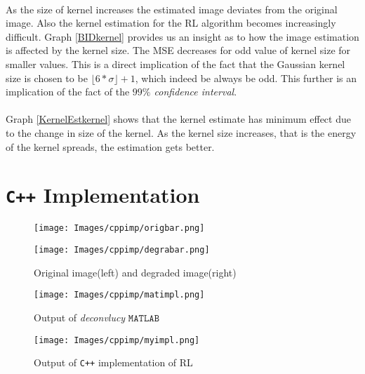 \documentclass[a4paper]{book}
\begin{document}
\paragraph*{} As the size of kernel increases the estimated image deviates from the original image. Also the kernel estimation for the RL algorithm becomes increasingly difficult. Graph \ref{BIDkernel} provides us an insight as to how the image estimation is affected by the kernel size. The MSE decreases for odd value of kernel size for smaller values. This is a direct implication of the fact that the Gaussian kernel size is chosen to be $\lfloor6*\sigma\rfloor + 1$, which indeed be always be odd. This further is an implication of the fact of the \textit{$ 99\% $ confidence interval}.
\paragraph*{} Graph \ref{KernelEstkernel} shows that the kernel estimate has minimum effect due to the change in size of the kernel. As the kernel size increases, that is the energy of the kernel spreads, the estimation gets better.

\section{\Large \texttt{C++} Implementation}

\begin{figure}[ht!]
	\begin{minipage}{0.45\textwidth}
		\centering
		\texttt{[image: Images/cppimp/origbar.png]}
	\end{minipage}\hfill
	\begin{minipage}{0.45\textwidth}
		\centering
		\texttt{[image: Images/cppimp/degrabar.png]}
	\end{minipage}
	\centering	
	\caption[Barbara Image \texttt{C++} implementation]{Original image(left) and degraded image(right)}
	\label{degrabar}
\end{figure}

\begin{figure}
	\centering
	\texttt{[image: Images/cppimp/matimpl.png]}
	\caption[$ \mathtt{MATLAB's}$ output ]{Output of \textit{deconvlucy} $ \mathtt{MATLAB} $}
	\label{matimpl}
\end{figure}

\begin{figure}
	\centering
	\texttt{[image: Images/cppimp/myimpl.png]}
	\caption[\texttt{C++} output]{Output of \texttt{C++} implementation of RL}
	\label{myimpl}
\end{figure}
\newpage
\end{document}
